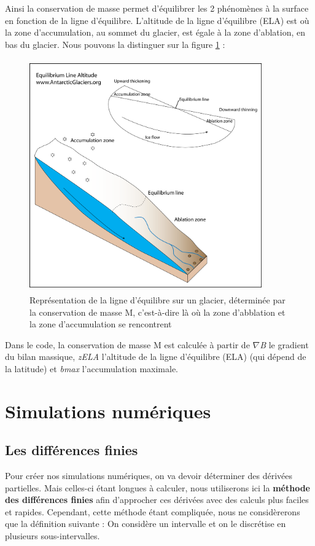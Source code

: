 \documentclass{article}
\begin{document}
Ainsi la conservation de masse permet d'équilibrer les 2 phénomènes à la surface en fonction de la ligne d'équilibre. L'altitude de la ligne d'équilibre (ELA) est où la zone d'accumulation, au sommet du glacier, est égale à la zone d'ablation, en bas du glacier. Nous pouvons la distinguer sur la figure \ref{fig02} : 

\begin{figure}[!htpb]
\centering
\includegraphics[width=10cm, keepaspectratio=true, height=10cm]{equilibrium_line_altitude1.png}
\caption{Représentation de la ligne d'équilibre sur un glacier, déterminée par la conservation de masse M, c'est-à-dire là où la zone d'abblation et la zone d'accumulation se rencontrent}
\label{fig02}
\end{figure}



Dans le code, la conservation de masse M est calculée à partir de $ \nabla$\textit{B} le gradient du bilan massique, \textit{zELA} l'altitude de la ligne d'équilibre (ELA) (qui dépend de la latitude) et \textit{bmax} l'accumulation maximale.
\newpage
\section{Simulations numériques}

\subsection{Les différences finies}
Pour créer nos simulations numériques, on va devoir déterminer des dérivées partielles. Mais celles-ci étant longues à calculer, nous utiliserons ici la \textbf{méthode des différences finies} afin d'approcher ces dérivées avec des calculs plus faciles et rapides.
\newline
Cependant, cette méthode étant compliquée, nous ne considèrerons que la définition suivante : On considère un intervalle et on le discrétise en plusieurs sous-intervalles.
\end{document}
